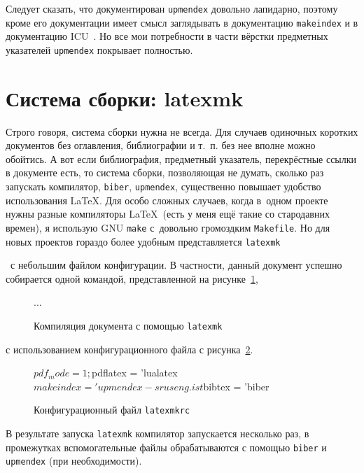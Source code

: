 \documentclass[a4paper,12pt,hyphens]{article}
\newcommand\exe[1]{\texttt{#1}}
\newcommand\file[1]{\texttt{#1}}
\begin{document}
Следует сказать, что документирован \exe{upmendex} довольно лапидарно, поэтому кроме его документации имеет смысл заглядывать в документацию \exe{makeindex} и в документацию ICU~\parencite{site-icu-docs}.
Но все мои потребности в части вёрстки предметных указателей \exe{upmendex} покрывает полностью.

\section{Система сборки: latexmk}
Строго говоря, система сборки нужна не всегда. Для случаев одиночных коротких
документов без оглавления, библиографии и т.~п. без нее вполне можно
обойтись. А вот если библиография, предметный указатель, перекрёстные
ссылки в документе есть, то система сборки, позволяющая не думать, сколько
раз запускать компилятор, \exe{biber}, \exe{upmendex}, существенно
повышает удобство использования \LaTeX. Для особо сложных случаев, когда
в~одном проекте нужны разные компиляторы \LaTeX\ (есть у меня ещё такие со
стародавних времен), я использую GNU \exe{make} \parencite{site-make}
с~довольно громоздким \file{Makefile}. Но для новых проектов гораздо
более удобным представляется
\exe{latexmk} \begin{otherlanguage}{english}\parencite{ctan-latexmk}\end{otherlanguage}\
с небольшим файлом конфигурации. В частности, данный документ успешно
собирается одной командой, представленной на рисунке~\ref{latexmk1},
\begin{figure}[tp]
\begin{shcode}

...

%
\end{shcode}
\caption{Компиляция документа с помощью \exe{latexmk}}\label{latexmk1}
\end{figure}
с использованием конфигурационного файла с рисунка~\ref{latexmk2}.
\begin{figure}[tp]
\begin{latexmkcode}
$pdf_mode = 1;
$pdflatex = 'lualatex %
$makeindex = 'upmendex -s ruseng.ist %
$bibtex = 'biber %
\end{latexmkcode}
\caption{Конфигурационный файл \file{latexmkrc}}\label{latexmk2}
\end{figure}
В результате запуска \exe{latexmk} компилятор запускается несколько раз,
в промежутках вспомогательные файлы обрабатываются с помощью \exe{biber}
и \exe{upmendex} (при необходимости).
\end{document}
